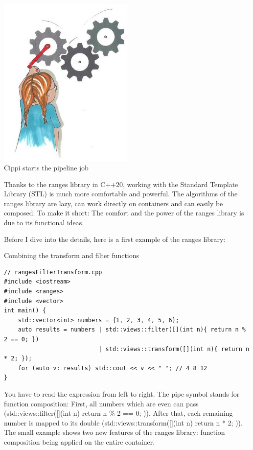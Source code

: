 \begin{center}
\includegraphics[width=0.5\textwidth]{content/3/chapter5/images/2.png}\\
Cippi starts the pipeline job
\end{center}

Thanks to the ranges library in C++20, working with the Standard Template Library (STL) is much more comfortable and powerful. The algorithms of the ranges library are lazy, can work directly on containers and can easily be composed. To make it short: The comfort and the power of the ranges library is due to its functional ideas.

Before I dive into the details, here is a first example of the ranges library:

\noindent
Combining the transform and filter functions
\begin{lstlisting}[style=styleCXX]
// rangesFilterTransform.cpp
#include <iostream>
#include <ranges>
#include <vector>
int main() {
	std::vector<int> numbers = {1, 2, 3, 4, 5, 6};
	auto results = numbers | std::views::filter([](int n){ return n % 2 == 0; })
						   | std::views::transform([](int n){ return n * 2; });
	for (auto v: results) std::cout << v << " "; // 4 8 12
}
\end{lstlisting}

You have to read the expression from left to right. The pipe symbol stands for function composition: First, all numbers which are even can pass (std::views::filter([](int n){ return n \% 2 == 0; })). After that, each remaining number is mapped to its double (std::views::transform([](int n){ return n * 2; })). The small example shows two new features of the ranges library: function composition being applied on the entire container.

